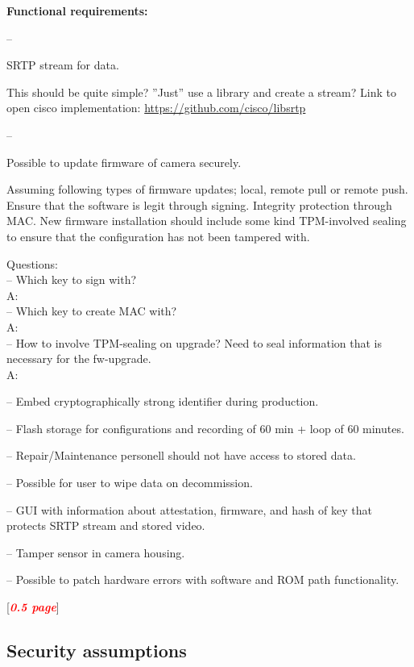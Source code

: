\documentclass[10pt]{article}
\newcommand{\todo}[1]{
  \begin{center}
    [\textcolor{red}{\textbf{\textit{#1}}}]
  \end{center}
}
\newenvironment{checklist}{%
  \begin{list}{}{}%
  \let\olditem\item
  \renewcommand\item{\olditem -- \marginpar{$\Box$} }
  \newcommand\checkeditem{\olditem -- \marginpar{$\CheckedBox$} }
}{%
  \end{list}
}
\begin{document}
    \textbf{Functional requirements:}
    \begin{checklist}
      \item{
        SRTP stream for data.

        This should be quite simple? ''Just'' use a library and create a
        stream? Link to open cisco implementation:
        \url{https://github.com/cisco/libsrtp}
      }
      \item{
        Possible to update firmware of camera securely.

        Assuming following types of firmware updates; local, remote pull or
        remote push. Ensure that the software is legit through signing.
        Integrity protection through MAC. New firmware installation should
        include some kind TPM-involved sealing to ensure that the configuration
        has not been tampered with.

        Questions: \\
        -- Which key to sign with? \\
        A: \\
        -- Which key to create MAC with? \\
        A: \\
        -- How to involve TPM-sealing on upgrade? Need to seal information that
        is necessary for the fw-upgrade.\\
        A: \\

      }
      \item{Embed cryptographically strong identifier during production.}
      \item{Flash storage for configurations and recording of 60 min + loop of 60 minutes.}
      \item{Repair/Maintenance personell should not have access to stored data.}
      \item{Possible for user to wipe data on decommission.}
      \item{GUI with information about attestation, firmware, and hash of key
        that protects SRTP stream and stored video.}
      \item{Tamper sensor in camera housing.}
      \item{Possible to patch hardware errors with software and ROM path
        functionality.}
    \end{checklist}

    \todo{0.5 page}

    \subsection{Security assumptions}
\end{document}
